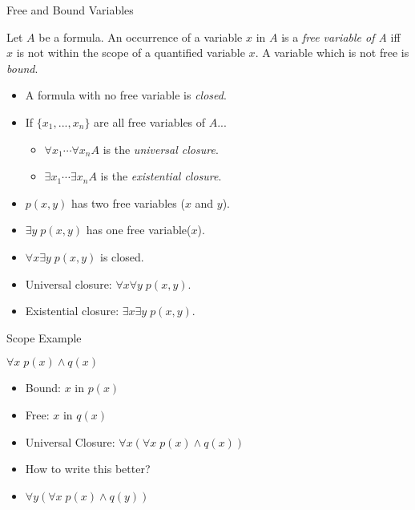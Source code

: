 \documentclass[style=sailor,size=12pt]{powerdot}
\begin{document}
\begin{wideslide}[bm=,toc=]{Free and Bound Variables}
\begin{defn}{7.12}
Let $A$ be a formula. An occurrence of a variable $x$ in $A$ is
a \emph{free variable of A} iff $x$ is not within the scope of
a quantified variable $x$. A variable which is not free is \emph{bound}.
\end{defn}
\vspace*{-2ex}
\begin{itemize}
\item A formula with no free variable is \emph{closed}.
\item If $\{x_1,...,x_n\}$ are all free variables of $A$...
  \begin{itemize}
      \item $\forall x_1 \cdots \forall x_n A$ is the \emph{universal closure}.
      \item $\exists x_1 \cdots \exists x_n A$ is the \emph{existential closure}.
  \end{itemize}
\end{itemize}
\vspace*{-2ex}
\begin{ex}{7.13}
\end{ex}
\vspace*{-2ex}
\begin{itemize}
\item $p(x,y)$ has two free variables ($x$ and $y$).
\item $\exists y\; p(x,y)$ has one free variable($x$).
\item $\forall x \exists y \;p(x,y)$ is closed.
\item Universal closure: $\forall x \forall y \;p(x,y)$.
\item Existential closure: $\exists x \exists y \;p(x,y)$.
\end{itemize}
\end{wideslide}
\begin{wideslide}[bm=,toc=]{Scope Example}
\begin{ex}{7.14}
$\forall x \; p(x) \land q(x)$
\end{ex}
\vspace*{-2ex}
\begin{itemize}
\item<2-> Bound: \pause[2] $x$ in $p(x)$
\item<4-> Free: \pause[2] $x$ in $q(x)$
\item<6-> Universal Closure: \pause[2] $\forall x(\forall x \; p(x) \land q(x))$
\item<8-> How to write this better?
\item<9-> $\forall y(\forall x \; p(x) \land q(y))$
\end{itemize}
\end{wideslide}
\end{document}
